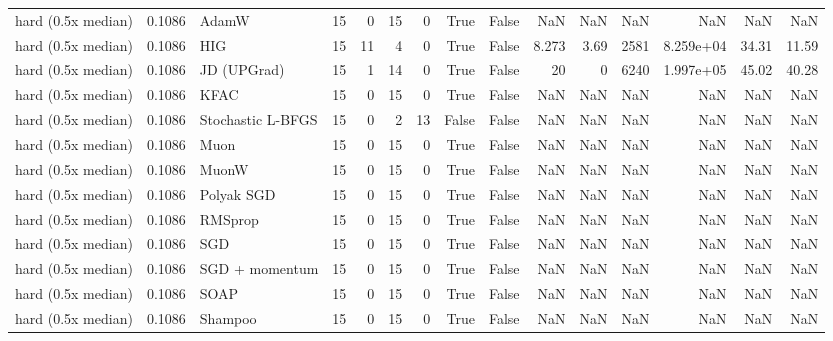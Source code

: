 \begin{tabular}{lrlrrrrrrrrrrrr}
hard (0.5x median) & 0.1086 & AdamW & 15 & 0 & 15 & 0 & True & False & NaN & NaN & NaN & NaN & NaN & NaN \\
hard (0.5x median) & 0.1086 & HIG & 15 & 11 & 4 & 0 & True & False & 8.273 & 3.69 & 2581 & 8.259e+04 & 34.31 & 11.59 \\
hard (0.5x median) & 0.1086 & JD (UPGrad) & 15 & 1 & 14 & 0 & True & False & 20 & 0 & 6240 & 1.997e+05 & 45.02 & 40.28 \\
hard (0.5x median) & 0.1086 & KFAC & 15 & 0 & 15 & 0 & True & False & NaN & NaN & NaN & NaN & NaN & NaN \\
hard (0.5x median) & 0.1086 & Stochastic L-BFGS & 15 & 0 & 2 & 13 & False & False & NaN & NaN & NaN & NaN & NaN & NaN \\
hard (0.5x median) & 0.1086 & Muon & 15 & 0 & 15 & 0 & True & False & NaN & NaN & NaN & NaN & NaN & NaN \\
hard (0.5x median) & 0.1086 & MuonW & 15 & 0 & 15 & 0 & True & False & NaN & NaN & NaN & NaN & NaN & NaN \\
hard (0.5x median) & 0.1086 & Polyak SGD & 15 & 0 & 15 & 0 & True & False & NaN & NaN & NaN & NaN & NaN & NaN \\
hard (0.5x median) & 0.1086 & RMSprop & 15 & 0 & 15 & 0 & True & False & NaN & NaN & NaN & NaN & NaN & NaN \\
hard (0.5x median) & 0.1086 & SGD & 15 & 0 & 15 & 0 & True & False & NaN & NaN & NaN & NaN & NaN & NaN \\
hard (0.5x median) & 0.1086 & SGD + momentum & 15 & 0 & 15 & 0 & True & False & NaN & NaN & NaN & NaN & NaN & NaN \\
hard (0.5x median) & 0.1086 & SOAP & 15 & 0 & 15 & 0 & True & False & NaN & NaN & NaN & NaN & NaN & NaN \\
hard (0.5x median) & 0.1086 & Shampoo & 15 & 0 & 15 & 0 & True & False & NaN & NaN & NaN & NaN & NaN & NaN \\
\bottomrule
\end{tabular}
